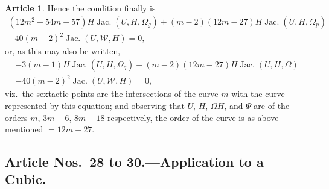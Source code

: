 \documentclass[12pt,a4paper]{article}
\theoremstyle{definition}
\newtheorem{art}{Article}[section]
\DeclareMathOperator{\Jac}{Jac.}
\begin{document}
\begin{art}
Hence the condition finally is
\begin{multline*}
(12m^2 - 54m + 57)H\Jac(U, H, \Omega_g) + (m - 2)(12m - 27)H\Jac(U, H, \Omega_p) \\
- 40(m - 2)^2\Jac(U, \mathcal{W}, H) = 0,
\end{multline*}
or, as this may also be written,
\begin{multline*}
-3(m - 1)H\Jac(U, H, \Omega_g) + (m - 2)(12m - 27)H\Jac(U, H, \Omega) \\
- 40(m - 2)^2\Jac(U, \mathcal{W}, H) = 0,
\end{multline*}
viz.\ the sextactic points are the intersections of the curve $m$ with the curve represented by this equation; and observing that $U$, $H$, $\Omega H$, and $\Psi$ are of the orders $m$, $3m - 6$, $8m - 18$ respectively, the order of the curve is as above mentioned $= 12m - 27$.
\end{art}

\subsection*{Article Nos.\ 28 to 30.---Application to a Cubic.}
\end{document}
